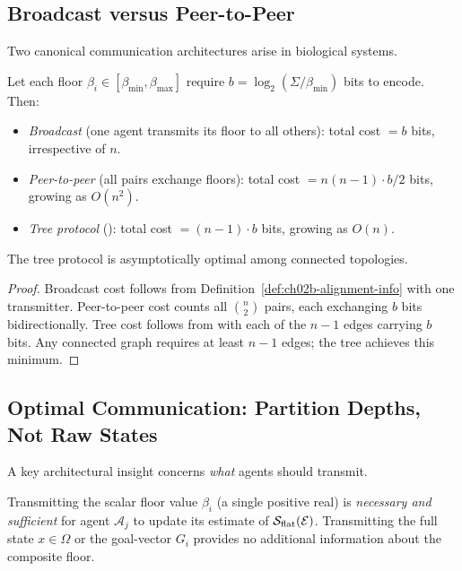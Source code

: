 \subsection{Broadcast versus Peer-to-Peer}

Two canonical communication architectures arise in biological systems.

\begin{proposition}
\label{prop:ch02b-broadcast-vs-p2p}
Let each floor $\beta_i \in [\beta_{\min}, \beta_{\max}]$ require
$b = \log_2(\Sigma/\beta_{\min})$ bits to encode.  Then:
\begin{itemize}[leftmargin=2em]
  \item \emph{Broadcast} (one agent transmits its floor to all others):
    total cost $= b$ bits, irrespective of $n$.
  \item \emph{Peer-to-peer} (all pairs exchange floors):
    total cost $= n(n-1) \cdot b / 2$ bits, growing as $O(n^2)$.
  \item \emph{Tree protocol} ():
    total cost $= (n-1) \cdot b$ bits, growing as $O(n)$.
\end{itemize}
The tree protocol is asymptotically optimal among connected topologies.
\end{proposition}

\begin{proof}
Broadcast cost follows from Definition~\ref{def:ch02b-alignment-info} with one
transmitter.  Peer-to-peer cost counts all $\binom{n}{2}$ pairs, each
exchanging $b$ bits bidirectionally.  Tree cost follows from
 with each of the $n-1$ edges carrying $b$
bits.  Any connected graph requires at least $n-1$ edges; the tree achieves
this minimum.
\end{proof}

\subsection{Optimal Communication: Partition Depths, Not Raw States}

A key architectural insight concerns \emph{what} agents should transmit.

\begin{proposition}
\label{prop:ch02b-floor-sufficient}
Transmitting the scalar floor value $\beta_i$ (a single positive real) is
\emph{necessary and sufficient} for agent $\mathcal{A}_j$ to update its
estimate of $\mathcal{S}_{\mathrm{flat}}(\mathcal{E})$.  Transmitting the full
state $x \in \Omega$ or the goal-vector $G_i$ provides no additional
information about the composite floor.
\end{proposition}

